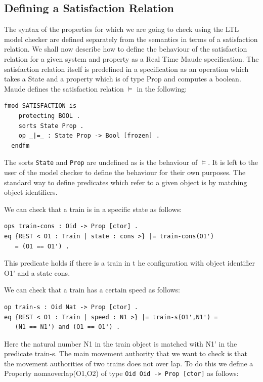 \subsection*{Defining a Satisfaction Relation}
The syntax of the properties for which we are going to check using the LTL model checker are defined separately from the semantics in terms of a satisfaction relation.
We shall now describe how to define the behaviour of the satisfaction relation for a given system and property as a Real Time Maude specification. The satisfaction relation itself is predefined in a specification as an operation which takes a State and a property which is of type Prop and computes a boolean. Maude defines the satisfaction relation $\models$ in the following:
\medskip

\begin{lstlisting}[caption =  The Maude Satisfaction module, label =code:satisfaction ]
  fmod SATISFACTION is  
    protecting BOOL .  
    sorts State Prop .  
    op _|=_ : State Prop -> Bool [frozen] .  
  endfm
\end{lstlisting}
\medskip
The sorts \texttt{State} and \texttt{Prop} are undefined as is the behaviour of $\models$. It is left to the user of the model checker to define the behaviour for their own purposes. The standard way to define predicates which refer to a given object is by matching object identifiers.

We can check that a train is in a specific state as follows:
\begin{lstlisting}[caption = The constant speed property]
ops train-cons : Oid -> Prop [ctor] .
eq {REST < O1 : Train | state : cons >} |= train-cons(O1') 
   = (O1 == O1') . 
\end{lstlisting}
This predicate holds if there is a train in t he configuration with object identifier O1' and a state cons. 

We can check that a train has a certain speed as follows:
\begin{lstlisting}[caption = The speed property]
op train-s : Oid Nat -> Prop [ctor] .
eq {REST < O1 : Train | speed : N1 >} |= train-s(O1',N1') = 
   (N1 == N1') and (O1 == O1') .
\end{lstlisting}

Here the natural number N1 in the train object is matched with N1' in the predicate train-s.
The main movement authority that we want to check is that the movement authorities of two trains does not over lap.
To do this we define a Property nomaoverlap(O1,O2) of type \texttt{Oid Oid -> Prop [ctor]} as follows: 

